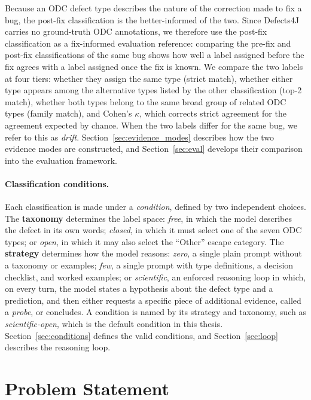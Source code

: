 \documentclass{iutbscthesis}
\begin{document}
Because an ODC defect type describes the nature of the correction made to fix a bug, the post-fix classification is the better-informed of the two. Since Defects4J carries no ground-truth ODC annotations, we therefore use the post-fix classification as a fix-informed evaluation reference: comparing the pre-fix and post-fix classifications of the same bug shows how well a label assigned before the fix agrees with a label assigned once the fix is known. We compare the two labels at four tiers: whether they assign the same type (strict match), whether either type appears among the alternative types listed by the other classification (top-2 match), whether both types belong to the same broad group of related ODC types (family match), and Cohen's $\kappa$, which corrects strict agreement for the agreement expected by chance. When the two labels differ for the same bug, we refer to this as \emph{drift}. Section~\ref{sec:evidence_modes} describes how the two evidence modes are constructed, and Section~\ref{sec:eval} develops their comparison into the evaluation framework.

\paragraph{Classification conditions.}
\label{sec:conditions_intro}
Each classification is made under a \emph{condition}, defined by two independent choices. The \textbf{taxonomy} determines the label space: \textit{free}, in which the model describes the defect in its own words; \textit{closed}, in which it must select one of the seven ODC types; or \textit{open}, in which it may also select the ``Other'' escape category. The \textbf{strategy} determines how the model reasons: \textit{zero}, a single plain prompt without a taxonomy or examples; \textit{few}, a single prompt with type definitions, a decision checklist, and worked examples; or \textit{scientific}, an enforced reasoning loop in which, on every turn, the model states a hypothesis about the defect type and a prediction, and then either requests a specific piece of additional evidence, called a \emph{probe}, or concludes. A condition is named by its strategy and taxonomy, such as \textit{scientific-open}, which is the default condition in this thesis. Section~\ref{sec:conditions} defines the valid conditions, and Section~\ref{sec:loop} describes the reasoning loop.

\section{Problem Statement} \label{sec:problem}
\end{document}
